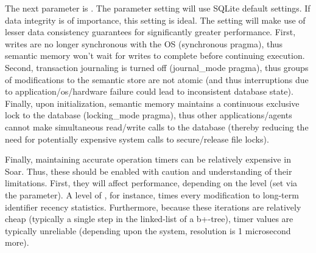 The next parameter is .  The  parameter setting will use SQLite default settings.  If data integrity is of importance, this setting is ideal.  The  setting will make use of lesser data consistency guarantees for significantly greater performance.  First, writes are no longer synchronous with the OS (synchronous pragma), thus semantic memory won't wait for writes to complete before continuing execution.  Second, transaction journaling is turned off (journal\_mode pragma), thus groups of modifications to the semantic store are not atomic (and thus interruptions due to application/os/hardware failure could lead to inconsistent database state).  Finally, upon initialization, semantic memory maintains a continuous exclusive lock to the database (locking\_mode pragma), thus other applications/agents cannot make simultaneous read/write calls to the database (thereby reducing the need for potentially expensive system calls to secure/release file locks).

Finally, maintaining accurate operation timers can be relatively expensive in Soar.  Thus, these should be enabled with caution and understanding of their limitations.  First, they will affect performance, depending on the level (set via the  parameter).  A level of , for instance, times every modification to long-term identifier recency statistics.  Furthermore, because these iterations are relatively cheap (typically a single step in the linked-list of a b+-tree), timer values are typically unreliable (depending upon the system, resolution is 1 microsecond more).
